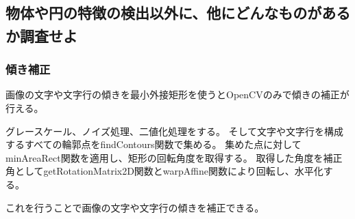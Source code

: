 \documentclass{jlreq}
\begin{document}
\subsection{物体や円の特徴の検出以外に、他にどんなものがあるか調査せよ\textsuperscript{\cite{Katamuki}}}
\subsubsection{傾き補正}
画像の文字や文字行の傾きを最小外接矩形を使うとOpenCVのみで傾きの補正が行える。

グレースケール、ノイズ処理、二値化処理をする。
そして文字や文字行を構成するすべての輪郭点をfindContours関数で集める。
集めた点に対してminAreaRect関数を適用し、矩形の回転角度を取得する。
取得した角度を補正角としてgetRotationMatrix2D関数とwarpAffine関数により回転し、水平化する。

これを行うことで画像の文字や文字行の傾きを補正できる。

\printbibliography[title=参考文献]
\end{document}
